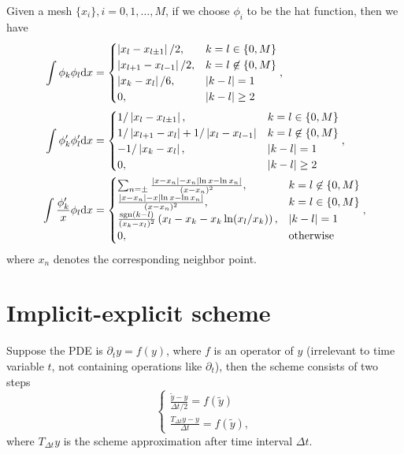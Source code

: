 \documentclass{article}
\begin{document}
  Given a mesh $\{x_i\},i = 0, 1, \ldots, M$, if we choose $\phi_i$ to be the hat function,
  then we have
  \[
    \begin{aligned}
      \int\phi_k\phi_l\mathrm d x &=
      \begin{cases}
        \left|x_l - x_{l \pm 1}\right| / 2,     &k = l \in \{0, M\} \\
        \left|x_{l + 1} - x_{l - 1}\right| / 2, &k = l \not\in \{0, M\} \\
        \left|x_k - x_l\right| / 6,             &|k - l| = 1 \\
        0,                                      &|k - l| \geq 2
      \end{cases}, \\
      \int\phi_k'\phi_l'\mathrm d x &=
      \begin{cases}
        1 / \left|x_l - x_{l \pm 1}\right|, &k = l \in \{0, M\} \\
        1 / \left|x_{l + 1} - x_l\right| + 1 / \left|x_l - x_{l - 1}\right|
                                            &k = l \not\in \{0, M\} \\
        -1 / \left|x_k - x_l\right|,        &|k - l| = 1 \\
        0,                                  &|k - l| \geq 2
      \end{cases}, \\
      \int\frac{\phi_k'}x\phi_l\mathrm d x &=
      \begin{cases}
          \sum_{n = \pm}\frac{|x - x_n| - x_n\left|\ln x - \ln x_n\right|}{(x - x_n)^2}, &k = l\not\in\{0, M\} \\
          \frac{|x - x_n| - x\left|\ln x - \ln x_n\right|}{(x - x_n)^2}, & k = l \in\{0, M\} \\
          \frac{\operatorname{sgn}(k - l)}{(x_k - x_l)^2}\left(x_l - x_k - x_k\ln(x_l / x_k)\right), & |k - l| = 1 \\
          0, &\text{otherwise}
      \end{cases},
    \end{aligned}
  \]
  where $x_n$ denotes the corresponding neighbor point.

  \section{Implicit-explicit scheme}
  Suppose the PDE is $\partial_t y = f(y)$, where $f$ is an operator of $y$ (irrelevant to time
  variable $t$, not containing operations like $\partial_t$), then the scheme consists of two steps
  \[
    \left\{
      \begin{aligned}
        \frac{\tilde y - y}{\Delta t / 2} = f(\tilde y)\\
        \frac{T_{\Delta t}y - y}{\Delta t} = f(\tilde y),
      \end{aligned}
    \right.
  \]
  where $T_{\Delta t}y$ is the scheme approximation after time interval $\Delta t$.
\end{document}
